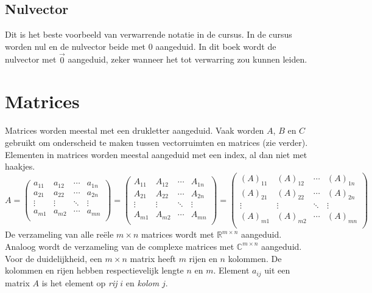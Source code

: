 \documentclass[lineaire_algebra_oplossingen.tex]{subfiles}
\begin{document}
\subsection{Nulvector}
Dit is het beste voorbeeld van verwarrende notatie in de cursus. In de cursus worden nul en de nulvector beide met $0$ aangeduid. In dit boek wordt de nulvector met $\vec{0}$ aangeduid, zeker wanneer het tot verwarring zou kunnen leiden.

\section{Matrices}
Matrices worden meestal met een drukletter aangeduid.
Vaak worden $A$, $B$ en $C$ gebruikt om onderscheid te maken tussen vectorruimten en matrices (zie verder). Elementen in matrices worden meestal aangeduid met een index, al dan niet met haakjes.
\[
A = 
\begin{pmatrix}
a_{11} & a_{12} & \cdots & a_{1n}\\
a_{21} & a_{22} & \cdots & a_{2n}\\
\vdots & \vdots & \ddots & \vdots\\
a_{m1} & a_{m2} & \cdots & a_{mn}\\
\end{pmatrix}
= 
\begin{pmatrix}
A_{11} & A_{12} & \cdots & A_{1n}\\
A_{21} & A_{22} & \cdots & A_{2n}\\
\vdots & \vdots & \ddots & \vdots\\
A_{m1} & A_{m2} & \cdots & A_{mn}\\
\end{pmatrix}
=
\begin{pmatrix}
(A)_{11} & (A)_{12} & \cdots & (A)_{1n}\\
(A)_{21} & (A)_{22} & \cdots & (A)_{2n}\\
\vdots & \vdots & \ddots & \vdots\\
(A)_{m1} & (A)_{m2} & \cdots & (A)_{mn}\\
\end{pmatrix}
\]
De verzameling van alle re\"ele $m\times n$ matrices wordt met $\mathbb{R}^{m\times n}$ aangeduid.
Analoog wordt de verzameling van de complexe matrices met $\mathbb{C}^{m\times n}$ aangeduid.
Voor de duidelijkheid, een $m \times n$ matrix heeft $m$ rijen en $n$ kolommen.
De kolommen en rijen hebben respectievelijk lengte $n$ en $m$.
Element $a_{ij}$ uit een matrix $A$ is het element op \emph{rij} $i$ en \emph{kolom} $j$.
\end{document}
